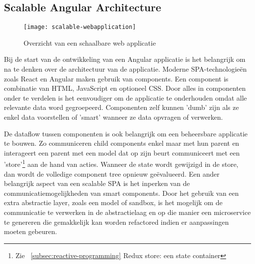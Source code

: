 \subsection{Scalable Angular Architecture}
\begin{figure}[h]
\caption{Overzicht van een schaalbare web applicatie}
\centering
\texttt{[image: scalable-webapplication]}
\end{figure}
Bij de start van de ontwikkeling van een Angular applicatie is het belangrijk om na te denken over de architectuur \autocite{minko-gechev-scalable} van de applicatie. Moderne SPA-technologie\"en zoals React en Angular maken gebruik van components. Een component is combinatie van HTML, JavaScript en optioneel CSS. Door alles in componenten onder te verdelen is het eenvoudiger om de applicatie te onderhouden omdat alle relevante data word gegroepeerd. Componenten zelf kunnen 'dumb' zijn als ze enkel data voorstellen of 'smart' wanneer ze data opvragen of verwerken.

De dataflow tussen componenten is ook belangrijk om een beheersbare \autocite{brechtbilliet-scalable} applicatie te bouwen. Zo communiceren child components enkel maar met hun parent en interageert een parent met een model dat op zijn beurt communiceert met een 'store'\footnote{Zie ~\ref{subsec:reactive-programming} Redux store: een state container} aan de hand van acties. Wanneer de state wordt gewijzigd in de store, dan wordt de volledige component tree opnieuw ge\"evalueerd. Een ander belangrijk aspect van een scalable SPA is het inperken van de communicatiemogelijkheden van smart components. Door het gebruik van een extra abstractie layer, zoals een model of sandbox, is het mogelijk om de communicatie te verwerken in de abstractielaag en op die manier een microservice te genereren die gemakkelijk kan worden refactored indien er aanpassingen moeten gebeuren.
\clearpage
